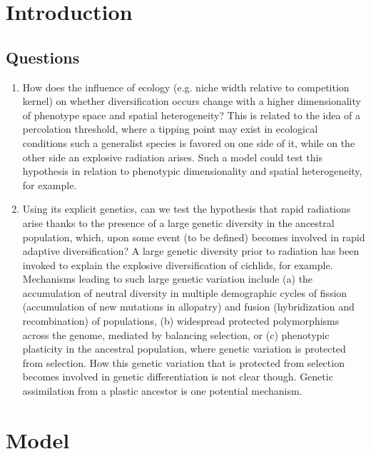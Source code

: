 \documentclass[]{article}
\begin{document}
\section*{Introduction}

\subsection*{Questions}

\begin{enumerate}

	\item How does the influence of ecology (e.g. niche width relative to competition kernel) on whether diversification occurs change with a higher dimensionality of phenotype space and spatial heterogeneity? This is related to the idea of a percolation threshold, where a tipping point may exist in ecological conditions such a generalist species is favored on one side of it, while on the other side an explosive radiation arises. Such a model could test this hypothesis in relation to phenotypic dimensionality and spatial heterogeneity, for example.
	
	\item Using its explicit genetics, can we test the hypothesis that rapid radiations arise thanks to the presence of a large genetic diversity in the ancestral population, which, upon some event (to be defined) becomes involved in rapid adaptive diversification? A large genetic diversity prior to radiation has been invoked to explain the explosive diversification of cichlids, for example. Mechanisms leading to such large genetic variation include (a) the accumulation of neutral diversity in multiple demographic cycles of fission (accumulation of new mutations in allopatry) and fusion (hybridization and recombination) of populations, (b) widespread protected polymorphisms across the genome, mediated by balancing selection, or (c) phenotypic plasticity in the ancestral population, where genetic variation is protected from selection. How this genetic variation that is protected from selection becomes involved in genetic differentiation is not clear though. Genetic assimilation from a plastic ancestor is one potential mechanism.	 
	
\end{enumerate}

\section*{Model}
\end{document}

